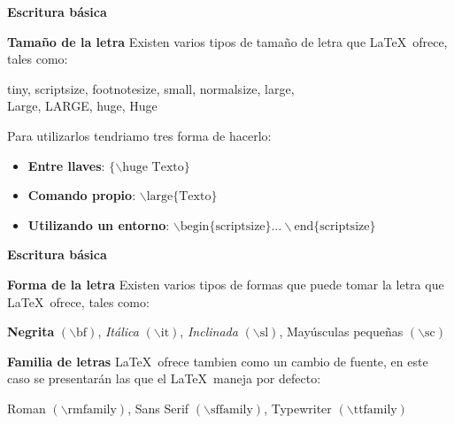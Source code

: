 \documentclass[aspectratio=169]{beamer}
\begin{document}
\begin{frame}{\bf Escritura básica}
\begin{alertblock}{\bf Tamaño de la letra}
Existen varios tipos de tamaño de letra que \LaTeX\ ofrece, tales como:\begin{center}
{\tiny tiny}, {\scriptsize scriptsize}, {\footnotesize footnotesize}, {\small small}, {\normalsize normalsize}, {\large large},\\{\Large Large}, {\LARGE LARGE}, {\huge huge}, {\Huge Huge}\end{center}
Para utilizarlos tendriamo tres forma de hacerlo:\begin{itemize}
\item \textbf{Entre llaves}: $\{\backslash\text{huge Texto}\}$
\item \textbf{Comando propio}: $\backslash\text{large\{Texto}\}$
\item \textbf{Utilizando un entorno}: $\backslash\text{begin}\{\text{scriptsize}\}\hdots \backslash\text{end}\{\text{scriptsize}\}$
\end{itemize}
\end{alertblock}
\end{frame}

\begin{frame}{\bf Escritura básica}
\begin{alertblock}{\bf Forma de la letra}
Existen varios tipos de formas que puede tomar la letra que \LaTeX\ ofrece, tales como:\begin{center}
{\bf Negrita} $(\backslash\text{bf})$, {\it Itálica} $(\backslash\text{it})$, {\sl Inclinada} $(\backslash\text{sl})$, {\sc Mayúsculas pequeñas} $(\backslash\text{sc})$
\end{center}
\end{alertblock}

\begin{alertblock}{\bf Familia de letras}
\LaTeX\ ofrece tambien como un cambio de fuente, en este caso se presentarán las que el \LaTeX\ maneja por defecto:\begin{center}
{\rmfamily Roman} $(\backslash\text{rmfamily})$, {\sffamily Sans Serif} $(\backslash\text{sffamily})$, {\ttfamily Typewriter} $(\backslash\text{ttfamily})$
\end{center}
\end{alertblock}
\end{frame}
\end{document}
